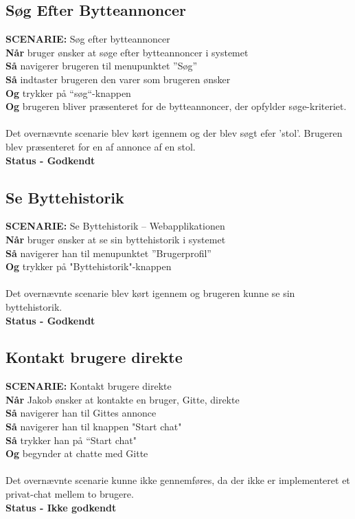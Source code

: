 \subsection{Søg Efter Bytteannoncer}
{\color{blue}\textbf{SCENARIE:}} Søg efter bytteannoncer \\
{\color{blue}\textbf{Når}} bruger ønsker at søge efter bytteannoncer i systemet\\
{\color{blue}\textbf{Så}} navigerer brugeren til menupunktet ”Søg” \\
{\color{blue}\textbf{Så}} indtaster brugeren den varer som brugeren ønsker\\
{\color{blue}\textbf{Og}} trykker på “søg“-knappen \\
{\color{blue}\textbf{Og}} brugeren bliver præsenteret for de bytteannoncer, der opfylder søge-kriteriet. \\ \\
Det overnævnte scenarie blev kørt igennem og der blev søgt efer 'stol'. Brugeren blev præsenteret for en af annonce af en stol. \\
\textbf{Status - Godkendt}

\subsection{Se Byttehistorik}
{\color{blue}\textbf{SCENARIE:}} Se Byttehistorik – Webapplikationen \\
{\color{blue}\textbf{Når}} bruger ønsker at se sin byttehistorik i systemet\\
{\color{blue}\textbf{Så}} navigerer han til menupunktet ”Brugerprofil” \\
{\color{blue}\textbf{Og}} trykker på "Byttehistorik"-knappen \\ \\
Det overnævnte scenarie blev kørt igennem og brugeren kunne se sin byttehistorik. \\
\textbf{Status - Godkendt}

\subsection{Kontakt brugere direkte}
{\color{blue}\textbf{SCENARIE:}} Kontakt brugere direkte\\
{\color{blue}\textbf{Når}} Jakob ønsker at kontakte en bruger, Gitte, direkte \\
{\color{blue}\textbf{Så}} navigerer han til Gittes annonce  \\
{\color{blue}\textbf{Så}} navigerer han til knappen "Start chat" \\
{\color{blue}\textbf{Så}} trykker han på “Start chat" \\
{\color{blue}\textbf{Og}} begynder at chatte med Gitte \\ 
\\
Det overnævnte scenarie kunne ikke gennemføres, da der ikke er implementeret et privat-chat mellem to brugere. \\
\textbf{Status - Ikke godkendt}


